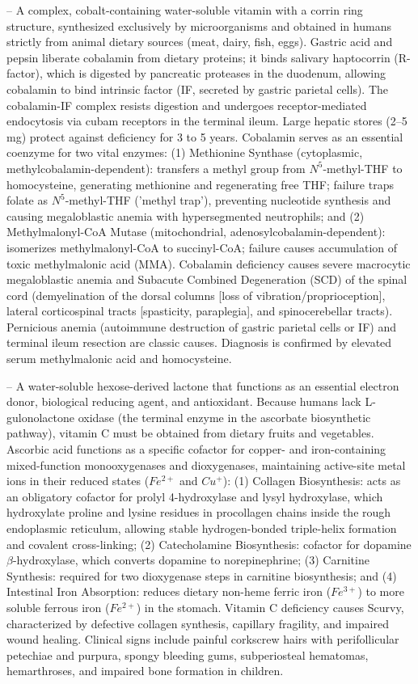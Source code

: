 -- A complex, cobalt-containing water-soluble vitamin with a corrin ring structure, synthesized exclusively by microorganisms and obtained in humans strictly from animal dietary sources (meat, dairy, fish, eggs). Gastric acid and pepsin liberate cobalamin from dietary proteins; it binds salivary haptocorrin (R-factor), which is digested by pancreatic proteases in the duodenum, allowing cobalamin to bind intrinsic factor (IF, secreted by gastric parietal cells). The cobalamin-IF complex resists digestion and undergoes receptor-mediated endocytosis via cubam receptors in the terminal ileum. Large hepatic stores (2--5 mg) protect against deficiency for 3 to 5 years. Cobalamin serves as an essential coenzyme for two vital enzymes: (1) Methionine Synthase (cytoplasmic, methylcobalamin-dependent): transfers a methyl group from $N^5$-methyl-THF to homocysteine, generating methionine and regenerating free THF; failure traps folate as $N^5$-methyl-THF ('methyl trap'), preventing nucleotide synthesis and causing megaloblastic anemia with hypersegmented neutrophils; and (2) Methylmalonyl-CoA Mutase (mitochondrial, adenosylcobalamin-dependent): isomerizes methylmalonyl-CoA to succinyl-CoA; failure causes accumulation of toxic methylmalonic acid (MMA). Cobalamin deficiency causes severe macrocytic megaloblastic anemia and Subacute Combined Degeneration (SCD) of the spinal cord (demyelination of the dorsal columns [loss of vibration/proprioception], lateral corticospinal tracts [spasticity, paraplegia], and spinocerebellar tracts). Pernicious anemia (autoimmune destruction of gastric parietal cells or IF) and terminal ileum resection are classic causes. Diagnosis is confirmed by elevated serum methylmalonic acid and homocysteine.

-- A water-soluble hexose-derived lactone that functions as an essential electron donor, biological reducing agent, and antioxidant. Because humans lack L-gulonolactone oxidase (the terminal enzyme in the ascorbate biosynthetic pathway), vitamin C must be obtained from dietary fruits and vegetables. Ascorbic acid functions as a specific cofactor for copper- and iron-containing mixed-function monooxygenases and dioxygenases, maintaining active-site metal ions in their reduced states ($Fe^{2+}$ and $Cu^+$): (1) Collagen Biosynthesis: acts as an obligatory cofactor for prolyl 4-hydroxylase and lysyl hydroxylase, which hydroxylate proline and lysine residues in procollagen chains inside the rough endoplasmic reticulum, allowing stable hydrogen-bonded triple-helix formation and covalent cross-linking; (2) Catecholamine Biosynthesis: cofactor for dopamine $\beta$-hydroxylase, which converts dopamine to norepinephrine; (3) Carnitine Synthesis: required for two dioxygenase steps in carnitine biosynthesis; and (4) Intestinal Iron Absorption: reduces dietary non-heme ferric iron ($Fe^{3+}$) to more soluble ferrous iron ($Fe^{2+}$) in the stomach. Vitamin C deficiency causes Scurvy, characterized by defective collagen synthesis, capillary fragility, and impaired wound healing. Clinical signs include painful corkscrew hairs with perifollicular petechiae and purpura, spongy bleeding gums, subperiosteal hematomas, hemarthroses, and impaired bone formation in children.

